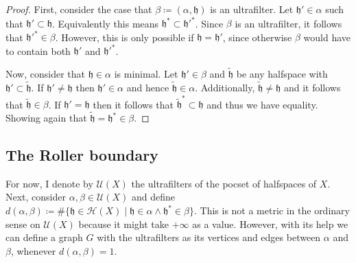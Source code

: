 \begin{proof}
  First, consider the case that \(\beta \coloneqq (\alpha, \mathfrak{h})\) is an ultrafilter. Let \(\mathfrak{h}' \in \alpha\) such that \(\mathfrak{h}' \subset \mathfrak{h}\). Equivalently this means \(\mathfrak{h}^\ast \subset \mathfrak{h}'^\ast\). Since \(\beta\) is an ultrafilter, it follows that \(\mathfrak{h}'^\ast \in \beta\). However, this is only possible if \(\mathfrak{h} = \mathfrak{h}'\), since otherwise \(\beta\) would have to contain both \(\mathfrak{h}' \) and \(\mathfrak{h}'^\ast\).

  Now, consider that \(\mathfrak{h} \in \alpha\) is minimal. Let \(\mathfrak{h}' \in \beta\) and \(\mathfrak{\tilde h}\) be any halfspace with \(\mathfrak{h}' \subset \mathfrak{\tilde h}\). If \(\mathfrak{h}' \neq \mathfrak{h}\) then \(\mathfrak{h}' \in \alpha \) and hence \(\mathfrak{\tilde h} \in \alpha\). Additionally, \(\mathfrak{\tilde h} \neq \mathfrak{h}\) and it follows that \(\mathfrak{\tilde h} \in \beta\). If \(\mathfrak{h}' = \mathfrak{h}\) then it follows that \(\mathfrak{\tilde h}^\ast \subset \mathfrak{h}\) and thus we have equality. Showing again that \(\mathfrak{\tilde h} = \mathfrak{h}^\ast \in \beta\).
\end{proof}

\subsection{The Roller boundary}
\label{sec:rb}

For now, I denote by \(\mathcal{U}(X)\) the ultrafilters of the pocset of halfspaces of \(X\). Next, consider \(\alpha, \beta \in \mathcal{U}(X)\) and define \(d(\alpha, \beta) \coloneqq \# \{ \mathfrak{h} \in \mathcal{H}(X)\mid \mathfrak{h} \in \alpha \wedge \mathfrak{h}^\ast \in \beta\}\). This is not a metric in the ordinary sense on \(\mathcal{U}(X)\) because it might take \(+\infty\) as a value. However, with its help we can define a graph \(G\) with the ultrafilters as its vertices and edges between \(\alpha\) and \(\beta\), whenever \(d(\alpha, \beta) = 1\).


